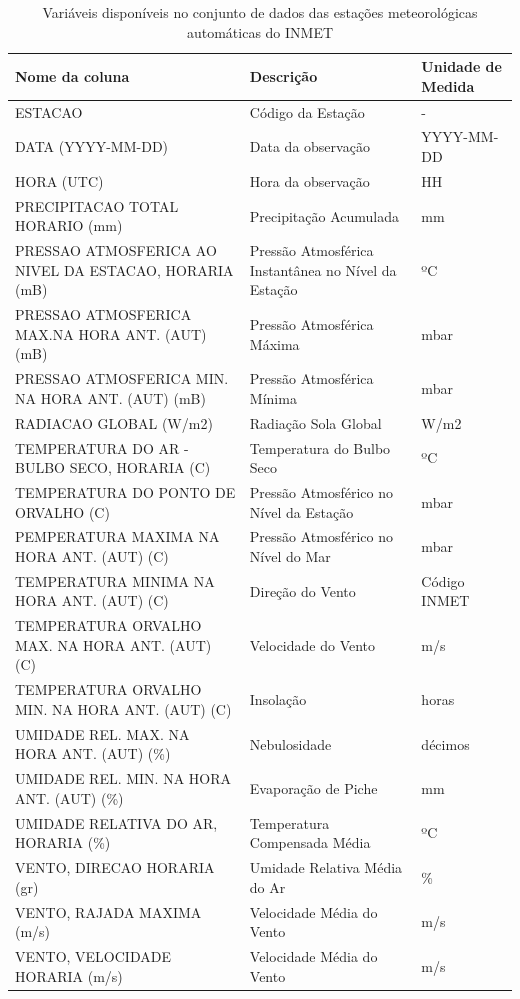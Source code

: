 \begin{table}[h!]
\caption{Variáveis disponíveis no conjunto de dados das estações meteorológicas automáticas do INMET}
\label{tab:variaveis_estacoes_automaticas}
\begin{adjustbox}{width=\textwidth}
\begin{tabular}{|l|l|l|}
\hline
\textbf{Nome da coluna} & \textbf{Descrição} & \textbf{Unidade de Medida}\\
\hline
ESTACAO & Código da Estação  & -\\
\hline
DATA (YYYY-MM-DD) & Data da observação  & YYYY-MM-DD\\
\hline
HORA (UTC) & Hora da observação  & HH\\
\hline
PRECIPITACAO TOTAL HORARIO (mm) & Precipitação Acumulada  & mm\\
\hline
PRESSAO ATMOSFERICA AO NIVEL DA ESTACAO, HORARIA (mB)  & Pressão Atmosférica Instantânea no Nível da Estação & ºC\\
\hline
PRESSAO ATMOSFERICA MAX.NA HORA ANT. (AUT) (mB) & Pressão Atmosférica Máxima & mbar\\
\hline
PRESSAO ATMOSFERICA MIN. NA HORA ANT. (AUT) (mB)  & Pressão Atmosférica Mínima & mbar\\
\hline
RADIACAO GLOBAL (W/m2)  & Radiação Sola Global & W/m2\\
\hline
TEMPERATURA DO AR - BULBO SECO, HORARIA (C)  & Temperatura do Bulbo Seco & ºC \\
\hline
TEMPERATURA DO PONTO DE ORVALHO (C)  & Pressão Atmosférico no Nível da Estação & mbar \\
\hline
PEMPERATURA MAXIMA NA HORA ANT. (AUT) (C)  & Pressão Atmosférico no Nível do Mar & mbar \\
\hline
TEMPERATURA MINIMA NA HORA ANT. (AUT) (C)  & Direção do Vento & Código INMET\\
\hline
TEMPERATURA ORVALHO MAX. NA HORA ANT. (AUT) (C)  & Velocidade do Vento & m/s\\
\hline
TEMPERATURA ORVALHO MIN. NA HORA ANT. (AUT) (C)  & Insolação & horas\\
\hline
UMIDADE REL. MAX. NA HORA ANT. (AUT) (\%) & Nebulosidade & décimos \\
\hline
UMIDADE REL. MIN. NA HORA ANT. (AUT) (\%) & Evaporação de Piche & mm\\
\hline
UMIDADE RELATIVA DO AR, HORARIA (\%) & Temperatura Compensada Média & ºC\\
\hline
VENTO, DIRECAO HORARIA (gr) & Umidade Relativa Média do Ar & \% \\
\hline
VENTO, RAJADA MAXIMA (m/s) & Velocidade Média do Vento & m/s\\
\hline
VENTO, VELOCIDADE HORARIA (m/s) & Velocidade Média do Vento & m/s\\
\hline
\end{tabular}
\end{adjustbox}
\end{table}

